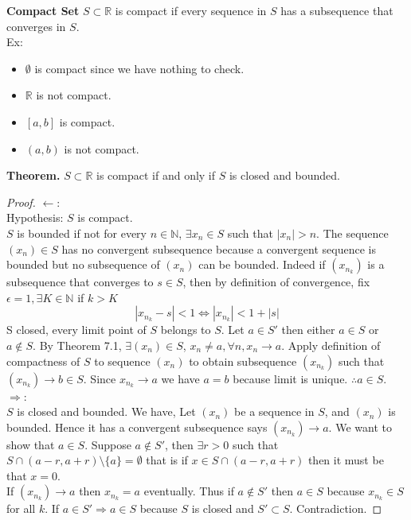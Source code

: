 \documentclass[10pt,letterpaper]{article}
\begin{document}
	\textbf{{\color{purple}Compact Set}}
	$S \subset \mathbb{R}$ is compact if every sequence in $S$ has a subsequence
	that converges in $S$. \\
	Ex: \\
	\begin{itemize}
		\item $\emptyset$ is compact since we have nothing to check.
		\item $\mathbb{R}$ is not compact.
		\item $[a,b]$ is compact.
		\item $(a,b)$ is not compact.
	\end{itemize}
	\textbf{Theorem. } $S \subset \mathbb{R}$ is compact if and only if $S$
	is closed and bounded.
	\begin{proof}
		$\leftarrow$:\\
		Hypothesis: $S$ is compact. \\
		$S$ is bounded if not for every $n \in \mathbb{N}$, $\exists x_n \in S$ such that
		$|x_n| > n$. The sequence $(x_n) \in S$ has no convergent subsequence because 
		a convergent sequence is bounded but no subsequence of $(x_n)$ can be bounded. 
		Indeed if $(x_{n_k})$ is a subsequence that converges to $s \in S$, then by definition
		of convergence, fix $\epsilon = 1, \exists K \in \mathbb{N}$ if $k > K$
		$$|x_{n_k} - s| < 1 \Leftrightarrow |x_{n_k}| < 1 + |s|$$
		S closed, every limit point of $S$ belongs to $S$. Let $a \in S'$  then 
		either $a \in S$ or $a \not\in S$. By Theorem 7.1, $\exists (x_n) \in S$,
		$x_n \neq a, \forall n, x_n \rightarrow a$. Apply definition of compactness of $S$
		to sequence $(x_n)$ to obtain subsequence $(x_{n_k})$ such that $(x_{n_k}) \rightarrow b \in S$.
		Since $x_{n_k} \rightarrow a$ we have $a = b$ because limit is unique. $\therefore a \in S$. \\
		$\Rightarrow$:\\
		$S$ is closed and bounded. We have,
		Let $(x_n)$ be a sequence in $S$, and $(x_n)$ is bounded. Hence it has a convergent
		subsequence says $(x_{n_k}) \rightarrow a$. We want to show that $a \in S$. Suppose 
		$a \not\in S'$, then $\exists r > 0$ such that $S \cap (a - r, a + r) \setminus \{a\} = \emptyset$
		that is if $x \in S \cap (a - r, a + r)$ then it must be that $x = 0$. \\
		If $(x_{n_k}) \rightarrow a$ then $x_{n_k} = a$ eventually. Thus if $a \not\in S'$ then 
		$a \in S$ because $x_{n_k} \in S$ for all $k$. If $a \in S' \Rightarrow a \in S$ because
		$S$ is closed and $S' \subset S$. Contradiction.
	\end{proof}
\end{document}
